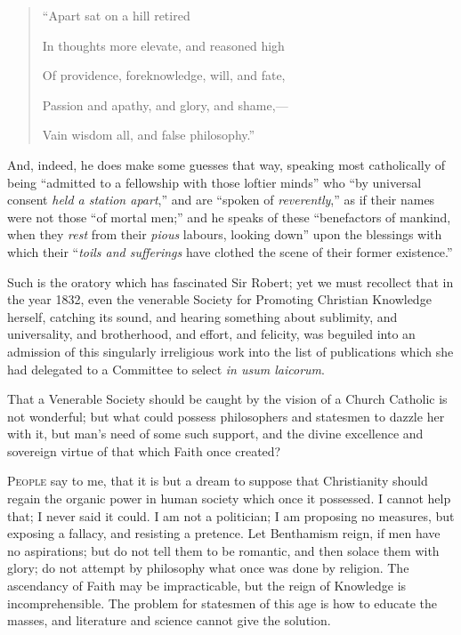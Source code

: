 \begin{quote}

``Apart sat on a hill retired

In thoughts more elevate, and reasoned high

Of providence, foreknowledge, will, and fate,

Passion and apathy, and glory, and shame,—

Vain wisdom all, and false philosophy.''

\end{quote}

And, indeed, he does make some guesses that way, speaking most
catholically of being ``admitted to a fellowship with those
loftier minds'' who ``by universal consent \emph{held a station
apart},'' and are ``spoken of \emph{reverently},'' as
if their names were not those ``of mortal men;'' and he speaks
of these ``benefactors of mankind, when they \emph{rest} from
their \emph{pious} labours, looking down'' upon the blessings with
which their ``\emph{toils and sufferings} have clothed the scene
of their former existence.''

Such is the oratory which has fascinated Sir Robert; yet we must
recollect that in the year 1832, even the venerable Society for
Promoting Christian Knowledge herself, catching its sound, and hearing
something about sublimity, and universality, and brotherhood, and
effort, and felicity, was beguiled into an admission of this
singularly irreligious work into the list of publications which
she had delegated to a Committee to select \emph{in usum laicorum}.

That a Venerable Society should be caught by the vision of a Church
Catholic is not wonderful; but what could possess philosophers and
statesmen to dazzle her with it, but man's need of some such support,
and the divine excellence and sovereign virtue of that which Faith
once created?


P\textsc{eople} say to me, that it is but a dream to suppose that
Christianity should regain the organic power in human society which
once it possessed. I cannot help that; I never said it could. I am not
a politician; I am proposing no measures, but exposing a fallacy, and
resisting a pretence. Let Benthamism reign, if men have no
aspirations; but do not tell them to be romantic, and then solace them
with glory; do not attempt by philosophy what once was done by
religion. The ascendancy of Faith may be impracticable, but the reign
of Knowledge is incomprehensible. The problem for statesmen of this
age is how to educate the masses, and literature and science cannot
give the solution.

